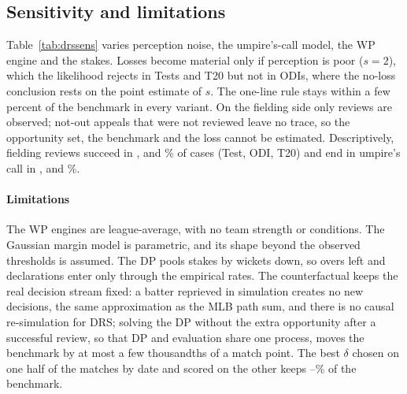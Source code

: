 \documentclass[aoas]{imsart}
\theoremstyle{plain}
\theoremstyle{definition}
\begin{document}
\begin{table}[!htbp]
\caption{Optimal LBW review threshold (\%) by wickets down and reviews left.}\label{tab:drsthr}
\centering\scriptsize
\resizebox{\textwidth}{!}{}
\end{table}

\begin{table}[!htbp]
\caption{Value of the last review against the out decisions left.}\label{tab:drssqrt}
\centering\small
\resizebox{\textwidth}{!}{}
\end{table}

\subsection{Sensitivity and limitations}
Table~\ref{tab:drssens} varies perception noise, the umpire's-call model, the WP engine and the stakes. Losses become
material only if perception is poor ($s=2$), which the likelihood rejects in Tests and T20 but not in ODIs, where the
no-loss conclusion rests on the point estimate of $s$. The one-line rule stays within a few percent of the benchmark in
every variant. On the fielding side only reviews are observed; not-out appeals that were not reviewed leave no trace,
so the opportunity set, the benchmark and the loss cannot be estimated. Descriptively, fielding reviews succeed in
\SDRSBowlTestSuccess, \SDRSBowlODISuccess{} and \SDRSBowlTtSuccess\% of cases (Test, ODI, T20) and end in umpire's call
in \SDRSBowlTestUC, \SDRSBowlODIUC{} and \SDRSBowlTtUC\%.

\begin{table}[!htbp]
\caption{DRS sensitivity, batting side: benchmark / lost vs fitted rule / one-line rule's share of the benchmark (\%), match
points per 100 team-matches. $-\Delta\ell$: profile log-likelihood loss of $s$.}\label{tab:drssens}
\centering\scriptsize
\resizebox{\textwidth}{!}{}
\end{table}

\paragraph{Limitations} The WP engines are league-average, with no team strength or conditions. The Gaussian margin
model is parametric, and its shape beyond the observed thresholds is assumed. The DP pools stakes by wickets down, so
overs left and declarations enter only through the empirical rates. The counterfactual keeps the real decision stream
fixed: a batter reprieved in simulation creates no new decisions, the same approximation as the MLB path sum, and there
is no causal re-simulation for DRS; solving the DP without the extra opportunity after a successful review, so that
DP and evaluation share one process, moves the benchmark by at most a few thousandths of a match point. The best
$\delta$ chosen on one half of the matches by date and scored on the other keeps \SDRSCrossShareLo--\SDRSCrossShareHi\%
of the benchmark.



\end{document}
